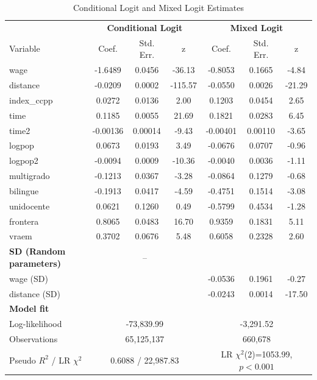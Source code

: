 \documentclass{article}
\begin{document}
\begin{table}[H]
\centering
\caption{Conditional Logit and Mixed Logit Estimates}
\label{tab:clogit_mixlogit}
\begin{threeparttable}
\begin{tabular}{lcccccc}
\toprule
 & \multicolumn{3}{c}{\textbf{Conditional Logit}} & \multicolumn{3}{c}{\textbf{Mixed Logit}} \\
\cmidrule(lr){2-4} \cmidrule(lr){5-7}
Variable & Coef. & Std. Err. & z & Coef. & Std. Err. & z \\
\midrule
wage            & -1.6489  & 0.0456 & -36.13 & -0.8053  & 0.1665 & -4.84 \\
distance        & -0.0209  & 0.0002 & -115.57 & -0.0550  & 0.0026 & -21.29 \\
index\_ccpp     &  0.0272  & 0.0136 & 2.00 &  0.1203  & 0.0454 & 2.65 \\
time            &  0.1185  & 0.0055 & 21.69 &  0.1821  & 0.0283 & 6.45 \\
time2           & -0.00136 & 0.00014 & -9.43 & -0.00401 & 0.00110 & -3.65 \\
logpop          &  0.0673  & 0.0193 & 3.49 & -0.0676  & 0.0707 & -0.96 \\
logpop2         & -0.0094  & 0.0009 & -10.36 & -0.0040  & 0.0036 & -1.11 \\
multigrado      & -0.1213  & 0.0367 & -3.28 & -0.0864  & 0.1279 & -0.68 \\
bilingue        & -0.1913  & 0.0417 & -4.59 & -0.4751  & 0.1514 & -3.08 \\
unidocente      &  0.0621  & 0.1260 & 0.49  & -0.5799  & 0.4534 & -1.28 \\
frontera        &  0.8065  & 0.0483 & 16.70 &  0.9359  & 0.1831 & 5.11 \\
vraem           &  0.3702  & 0.0676 & 5.48  &  0.6058  & 0.2328 & 2.60 \\
\midrule
\textbf{SD (Random parameters)} & \multicolumn{3}{c}{--} & & & \\
wage (SD)       &  &  &  & -0.0536 & 0.1961 & -0.27 \\
distance (SD)   &  &  &  & -0.0243 & 0.0014 & -17.50 \\
\midrule
\textbf{Model fit} & & & & & & \\
Log-likelihood     & \multicolumn{3}{c}{-73{,}839.99} & \multicolumn{3}{c}{-3{,}291.52} \\
Observations       & \multicolumn{3}{c}{65{,}125{,}137} & \multicolumn{3}{c}{660{,}678} \\
Pseudo $R^2$ / LR $\chi^2$ & \multicolumn{3}{c}{0.6088 / 22{,}987.83} & \multicolumn{3}{c}{LR $\chi^2$(2)=1053.99, $p<0.001$} \\
\bottomrule
\end{tabular}
\end{threeparttable}
\end{table}
\end{document}
